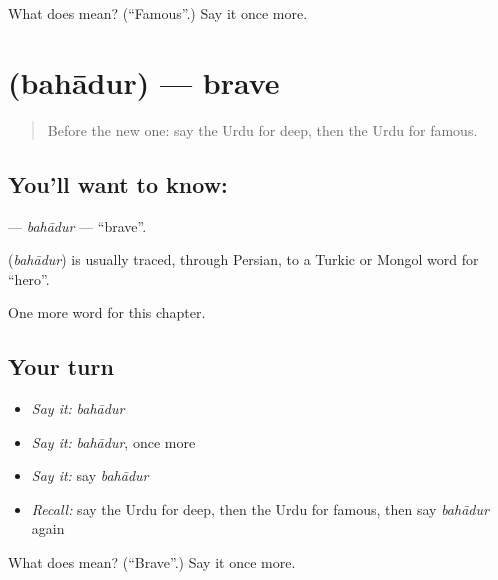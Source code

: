 \begin{tcolorbox}[breakable,colback=teal!4,colframe=teal!35!black,title={Before you move on}]
What does  mean? (\textquotedblleft{}Famous\textquotedblright{}.) Say it once more.
\end{tcolorbox}
\section[\texorpdfstring{\ur{بہادر} (bahādur)}{بہادر (bahādur)}]{ (bahādur) — brave}

\label{lesson:UR-C135-bahadur}



\begin{quote}
Before the new one: say the Urdu for deep, then the Urdu for famous.
\end{quote}

\subsection*{You'll want to know: }
\textbf{} — \emph{bahādur} — \textquotedblleft{}brave\textquotedblright{}.

\begin{cousinweb}
\textbf{} (\emph{bahādur}) is usually traced, through Persian, to a Turkic or Mongol word for \textquotedblleft{}hero\textquotedblright{}.
\end{cousinweb}

\begin{grammarlens}[title={What you've built}]
One more word for this chapter.
\end{grammarlens}

\subsection*{Your turn}
\begin{itemize}
\raggedright
  \item \emph{Say it:} \emph{bahādur}
  \item \emph{Say it:} \emph{bahādur}, once more
  \item \emph{Say it:} say \emph{bahādur}
  \item \emph{Recall:} say the Urdu for deep, then the Urdu for famous, then say \emph{bahādur} again
\end{itemize}

\begin{tcolorbox}[breakable,colback=teal!4,colframe=teal!35!black,title={Before you move on}]
What does  mean? (\textquotedblleft{}Brave\textquotedblright{}.) Say it once more.
\end{tcolorbox}
